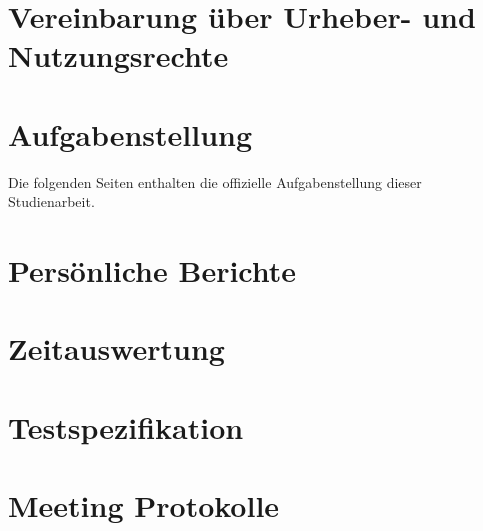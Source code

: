 \documentclass[11pt,a4paper,english,oneside]{book}
\numberwithin{equation}{chapter}
\begin{document}
	\chapter{Vereinbarung über Urheber- und Nutzungsrechte}
	
	
	\chapter{Aufgabenstellung}
	\label{aufgabenstellung}
	Die folgenden Seiten enthalten die offizielle Aufgabenstellung dieser Studienarbeit.
	
    


	\chapter{Persönliche Berichte}
	\label{erfahrungsberichte}
	
	\chapter{Zeitauswertung}
	\label{zeitauswertung}
	
	\chapter{Testspezifikation}
	
	\chapter{Meeting Protokolle}
	
	
	
\end{document}
